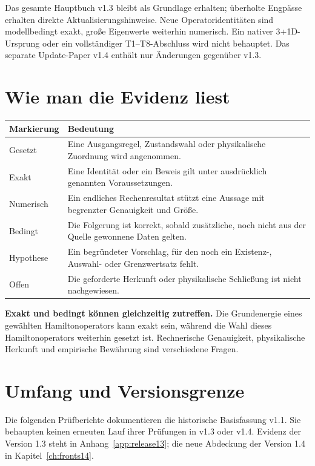 \documentclass[11pt,a4paper,oneside,parskip=half,headings=normal]{scrreprt}
\begin{document}
Das gesamte Hauptbuch v1.3 bleibt als Grundlage erhalten; überholte Engpässe erhalten direkte Aktualisierungshinweise. Neue Operatoridentitäten sind modellbedingt exakt, große Eigenwerte weiterhin numerisch. Ein nativer 3+1D-Ursprung oder ein vollständiger T1--T8-Abschluss wird nicht behauptet. Das separate Update-Paper v1.4 enthält nur Änderungen gegenüber v1.3.

\section*{Wie man die Evidenz liest}
\par\noindent\begin{tabularx}{\linewidth}{L{27mm}Y}
\toprule
\textbf{Markierung}&\textbf{Bedeutung}\\\midrule
Gesetzt&Eine Ausgangsregel, Zustandswahl oder physikalische Zuordnung wird angenommen.\\
Exakt&Eine Identität oder ein Beweis gilt unter ausdrücklich genannten Voraussetzungen.\\
Numerisch&Ein endliches Rechenresultat stützt eine Aussage mit begrenzter Genauigkeit und Größe.\\
Bedingt&Die Folgerung ist korrekt, sobald zusätzliche, noch nicht aus der Quelle gewonnene Daten gelten.\\
Hypothese&Ein begründeter Vorschlag, für den noch ein Existenz-, Auswahl- oder Grenzwertsatz fehlt.\\
Offen&Die geforderte Herkunft oder physikalische Schließung ist nicht nachgewiesen.\\\bottomrule
\end{tabularx}\par

\textbf{Exakt und bedingt können gleichzeitig zutreffen.} Die Grundenergie eines gewählten Hamiltonoperators kann exakt sein, während die Wahl dieses Hamiltonoperators weiterhin gesetzt ist. Rechnerische Genauigkeit, physikalische Herkunft und empirische Bewährung sind verschiedene Fragen.

\section*{Umfang und Versionsgrenze}
Die folgenden Prüfberichte dokumentieren die historische Basisfassung v1.1. Sie behaupten keinen erneuten Lauf ihrer Prüfungen in v1.3 oder v1.4. Evidenz der Version 1.3 steht in Anhang~\ref{app:release13}; die neue Abdeckung der Version 1.4 in Kapitel~\ref{ch:fronts14}.
\end{document}
